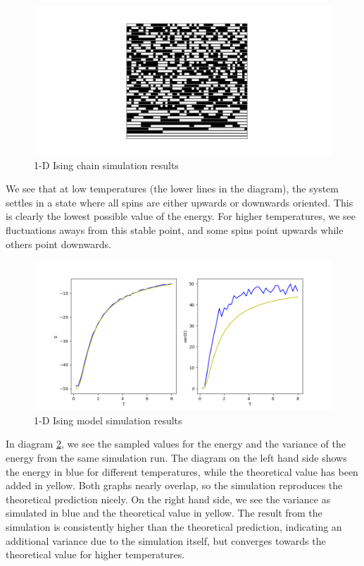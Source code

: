 \documentclass[a4paper, draft]{article}
\theoremstyle{own}
\theoremstyle{remark}
\begin{document}
\begin{figure}[ht]
\centering
\includegraphics[trim = 20mm 0mm 20mm 0mm, clip, width=\linewidth]{Ising1DPattern}
\caption{1-D Ising chain simulation results}
\label{fig:Ising1DPattern}
\end{figure}

We see that at low temperatures (the lower lines in the diagram), the system settles in a state where all spins are either upwards or downwards oriented. This is clearly the lowest possible value of the energy. For higher temperatures, we see fluctuations aways from this stable point, and some spins point upwards while others point downwards. 

\begin{figure}[ht]
\centering
\includegraphics[width=\linewidth]{Ising1DValues}
\caption{1-D Ising model simulation results}
\label{fig:Ising1DValues}
\end{figure}

In diagram \ref{fig:Ising1DValues}, we see the sampled values for the energy and the variance of the energy from the same simulation run. The diagram on the left hand side shows the energy in blue for different temperatures, while the theoretical value has been added in yellow. Both graphs nearly overlap, so the simulation reproduces the theoretical prediction nicely. On the right hand side, we see the variance as simulated in blue and the theoretical value in yellow. The result from the simulation is consistently higher than the theoretical prediction, indicating an additional variance due to the simulation itself, but converges towards the theoretical value for higher temperatures.
\end{document}
